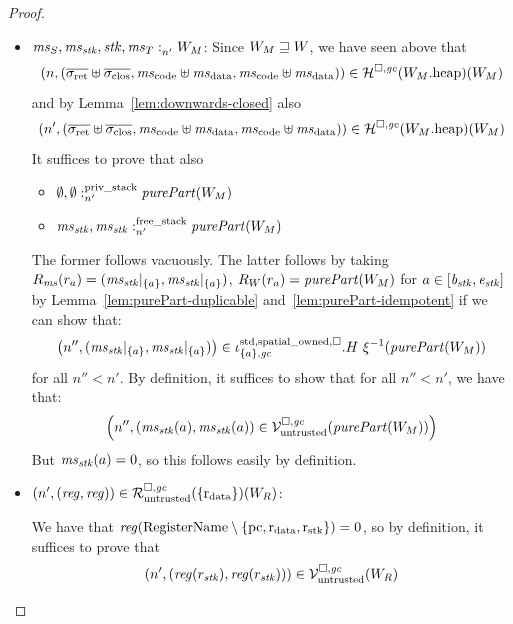 \documentclass[a4paper]{article}
\begin{document}
\begin{proof}
\begin{itemize}
  \item $\memSat[n']{\ms_S,\ms_\stk,\stk,\ms_T}{W_M}$:
    Since $W_M \future W$, we have seen above that 
    \begin{equation*}
      \npair{(\sigrets\uplus\sigcloss,\mscode\uplus \msdata, \mscode\uplus\msdata)} \in \lrheap(\pwheap[W_M])(W_M)
    \end{equation*}
    and by Lemma~\ref{lem:downwards-closed} also
    \begin{equation*}
      \npair[n']{(\sigrets\uplus\sigcloss,\mscode\uplus \msdata, \mscode\uplus\msdata)} \in \lrheap(\pwheap[W_M])(W_M)
    \end{equation*}
    It suffices to prove that also
    \begin{itemize}
    \item $\memSatStack[n']{\emptyset,\emptyset}{\purePart{W_M}}$
    \item $\memSatFStack[n']{\ms_\stk,\ms_\stk}{\purePart{W_M}}$
    \end{itemize}
    The former follows vacuously.
    The latter follows by taking $R_\ms(r_a) = (\ms_\stk|_{\{a\}},\ms_\stk|_{\{a\}})$, $R_W(r_a) = \purePart{W_M}$ for $a \in [\baddr_\stk,\eaddr_\stk]$ by Lemma~\ref{lem:purePart-duplicable} and~\ref{lem:purePart-idempotent} if we can show that:
    \begin{equation*}
      \npair[n'']{(\ms_\stk|_{\{a\}},\ms_\stk|_{\{a\}})} \in \stdreg{\{a\},\gc}{\spatialo}.H~ \xi^{-1}(\purePart{W_M})
    \end{equation*}
    for all $n'' < n'$.
    By definition, it suffices to show that for all $n'' < n'$, we have that:
    \begin{equation*}
      \npair[n'']{(\ms_\stk(a),\ms_\stk(a)) \in \lrv(\purePart{W_M})}
    \end{equation*}
    But $\ms_\stk(a) = 0$, so this follows easily by definition.

  \item $\npair[n']{(\reg,\reg)} \in \lrr(\{\rdata\})(W_R)$:
    
    We have that $\reg(\RegName \setminus \{\pcreg,\rdata,\rstk\}) = 0$, so by definition, it suffices to prove that
    \begin{equation*}
      \npair[n']{(\reg(r_\stk),\reg(r_\stk))} \in \lrv(W_R)
    \end{equation*}


\end{itemize}
\end{proof}
\end{document}
